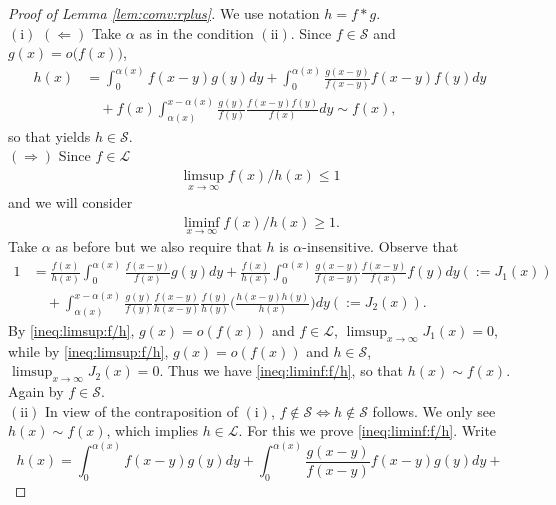 \documentclass[12pt,leqno]{amsart}
\newcommand{\cals}{{\mathcal S}}
\newcommand{\call}{{\mathcal L}}
\newcommand{\1}{{\mathbf 1}}
\begin{document}
\begin{proof}[Proof of Lemma \ref{lem:comv:rplus}]
We use notation $h=f\ast g$. \\
$(\mathrm{i})$ $(\Leftarrow)$ Take $\alpha$ as in the condition $(\mathrm{ii})$. 
Since $f\in \cals$ and $g(x)=o\big(f(x)\big)$,  
\begin{align*}
 h(x) %
      &= \int_0^{\alpha(x)} f(x-y)g(y)dy + \int_0^{\alpha(x)} \frac{g(x-y)}{f(x-y)}f(x-y)f(y)dy \\
&\quad  + f(x)\int_{\alpha(x)}^{x-\alpha(x)}
\frac{g(y)}{f(y)} \frac{f(x-y) f(y)}{f(x)}dy \sim f(x),%
\end{align*}
so that \cite[Theorem 4.8]{Foss:Korshunov:Zachary:2013} yields $h\in \cals$.  \\
$(\Rightarrow)$ Since $f\in \call$ 
\begin{align}
\label{ineq:limsup:f/h}
 \limsup_{x\to\infty}f(x)/h(x)\le 1
\end{align}
and we will consider 
\begin{align}
\label{ineq:liminf:f/h}
 \liminf_{x\to\infty} f(x)/h(x) \ge 1. 
\end{align}
Take $\alpha$ as before but we also require that $h$ 
is $\alpha$-insensitive. Observe that 
\begin{align*}
 1 &= \frac{f(x)}{h(x)} \int_{0}^{\alpha(x)} \frac{f(x-y)}{f(x)}g(y)dy + 
\frac{f(x)}{h(x)} 
\int_{0}^{\alpha(x)} \frac{g(x-y)}{f(x-y)}\frac{f(x-y)}{f(x)}f(y)dy (:=J_1(x)) \\
&\quad + \int_{\alpha(x)}^{x-\alpha(x)} \frac{g(y)}{f(y)} \frac{f(x-y)}{h(x-y)} \frac{f(y)}{h(y)} \Big( \frac{h(x-y)h(y)}{h(x)} \Big) dy 
(:=J_2(x)). 
\end{align*} 
By \eqref{ineq:limsup:f/h}, $g(x)=o(f(x))$ and $f\in\call$, $\limsup_{x\to\infty} J_1(x)=0$, while 
by \eqref{ineq:limsup:f/h}, $g(x)=o(f(x))$ and $h\in \cals$, $\limsup_{x\to\infty} J_2(x)=0$. 
Thus we have \eqref{ineq:liminf:f/h}, so that $h(x)\sim f(x)$. Again by \cite[Theorem 4.8]{Foss:Korshunov:Zachary:2013} $f\in \cals$. \\
$(\mathrm{ii})$ 
In view of the contraposition of $(\mathrm{i})$, $f\notin \cals \Leftrightarrow h\notin \cals$ follows. 
We only see $h(x)\sim f(x)$, which implies $h \in \call$. For this 
we prove \eqref{ineq:liminf:f/h}. Write 
\[
 h(x)=\int_0^{\alpha(x)} f(x-y)g(y)dy + \int_0^{\alpha(x)} \frac{g(x-y)}{f(x-y)}f(x-y)g(y)dy +
\]
\end{proof}
\end{document}
